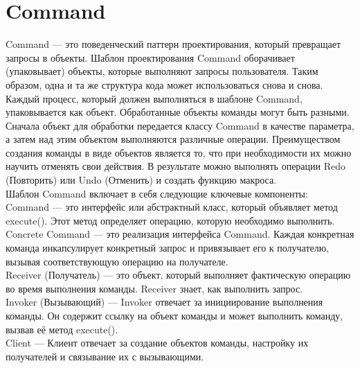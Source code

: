 {\section{Command}
Command — это поведенческий паттерн проектирования, который превращает запросы в объекты. Шаблон проектирования Command оборачивает (упаковывает) объекты, которые выполняют запросы пользователя. Таким образом, одна и та же структура кода может использоваться снова и снова. Каждый процесс, который должен выполняться в шаблоне Command, упаковывается как объект. Обработанные объекты команды могут быть разными. Сначала объект для обработки передается классу Command в качестве параметра, а затем над этим объектом выполняются различные операции. Преимуществом создания команды в виде объектов является то, что при необходимости их можно научить отменять свои действия. В результате можно выполнять операции Redo (Повторить) или Undo (Отменить) и создать функцию макроса. \\
Шаблон Command включает в себя следующие ключевые компоненты: \\
Command — это интерфейс или абстрактный класс, который объявляет метод execute(). Этот метод определяет операцию, которую необходимо выполнить. \\
Concrete Command — это реализация интерфейса Command. Каждая конкретная команда инкапсулирует конкретный запрос и привязывает его к получателю, вызывая соответствующую операцию на получателе. \\
Receiver (Получатель) — это объект, который выполняет фактическую операцию во время выполнения команды. Receiver знает, как выполнить запрос. \\
Invoker (Вызывающий) — Invoker отвечает за инициирование выполнения команды. Он содержит ссылку на объект команды и может выполнить команду, вызвав её метод execute(). \\
Client — Клиент отвечает за создание объектов команды, настройку их получателей и связывание их с вызывающими.
}
